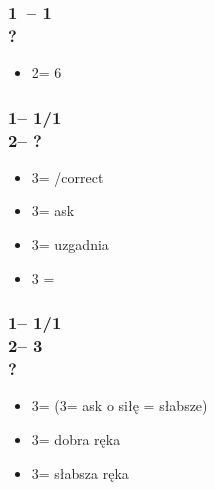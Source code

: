 \documentclass[12pt, a4paper]{article}
\begin{document}
\subsubsection*{1\spades\ -- 1\ntx\ \\ ?}
\begin{itemize}
    \item 2\nt = 6\minor \gf
\end{itemize}

\subsubsection*{1\major -- 1\spades/1\nt\\
                2\nt -- ?}
\begin{itemize}
    \item 3\clubs = \pass/correct
    \item 3\diams = ask \gf
    \item 3\major = uzgadnia \major
    \item 3\twosuit{\spades}{\hearts} = \nat
\end{itemize}

\subsubsection*{1\major -- 1\spades/1\nt\\
                2\nt -- 3\diams\\
                ?}
\begin{itemize}
    \item 3\hearts = \clubs (3\spades = ask o siłę \nt = słabsze)
    \item 3\spades = \diams dobra ręka
    \item 3\nt = \diams słabsza ręka
\end{itemize}
\end{document}
